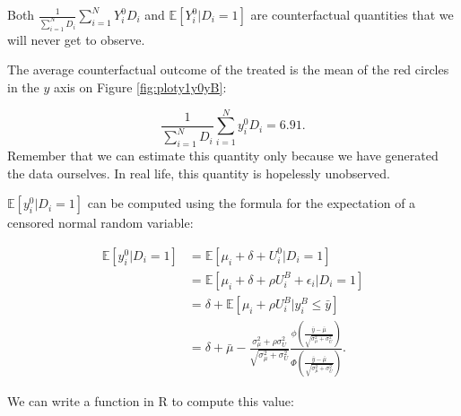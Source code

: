 \documentclass[]{book}
\newcommand{\esp}[1]{\mathbb{E}[ #1 ]}
\theoremstyle{definition}
\theoremstyle{definition}
\theoremstyle{definition}
\theoremstyle{remark}
\let\BeginKnitrBlock\begin \let\EndKnitrBlock\end
\begin{document}
\BeginKnitrBlock{definition}[Couterfactual]
\protect\hypertarget{def:counter}{}{\label{def:counter}
\iffalse (Couterfactual) \fi{} }Both
\(\frac{1}{\sum_{i=1}^ND_i}\sum_{i=1}^NY_i^0D_i\) and
\(\esp{Y_i^0|D_i=1}\) are counterfactual quantities that we will never
get to observe.
\EndKnitrBlock{definition}

\BeginKnitrBlock{example}
\protect\hypertarget{exm:unnamed-chunk-11}{}{\label{exm:unnamed-chunk-11}
}The average counterfactual outcome of the treated is the mean of the
red circles in the \(y\) axis on Figure \ref{fig:ploty1y0yB}:
\EndKnitrBlock{example} \[
\frac{1}{\sum_{i=1}^ND_i}\sum_{i=1}^Ny_i^0D_i= 6.91.
\] Remember that we can estimate this quantity only because we have
generated the data ourselves. In real life, this quantity is hopelessly
unobserved.

\(\esp{y_i^0|D_i=1}\) can be computed using the formula for the
expectation of a censored normal random variable:

\begin{align*}
\esp{y_i^0|D_i=1} & = \esp{\mu_i+\delta+U_i^0|D_i=1}\\
                  & = \esp{\mu_i+\delta+\rho U_i^B+\epsilon_i|D_i=1}\\
                  & = \delta + \esp{\mu_i+\rho U_i^B|y_i^B\leq\bar{y}}\\
                  & = \delta + \bar{\mu} - \frac{\sigma^2_{\mu}+\rho\sigma^2_U}{\sqrt{\sigma^2_{\mu}+\sigma^2_{U}}}\frac{\phi\left(\frac{\bar{y}-\bar{\mu}}{\sqrt{\sigma^2_{\mu}+\sigma^2_{U}}}\right)}{\Phi\left(\frac{\bar{y}-\bar{\mu}}{\sqrt{\sigma^2_{\mu}+\sigma^2_{U}}}\right)}.
\end{align*}

We can write a function in R to compute this value:
\end{document}
